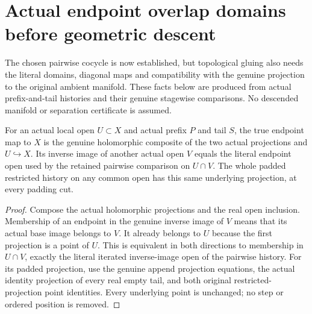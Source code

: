 \section{Actual endpoint overlap domains before geometric descent}

The chosen pairwise cocycle is now established, but topological gluing also
needs the literal domains, diagonal maps and compatibility with the genuine
projection to the original ambient manifold. These facts below are produced
from actual prefix-and-tail histories and their genuine stagewise comparisons.
No descended manifold or separation certificate is assumed.

\begin{lemma}
\label{hir:sharp-actual-endpoint-projection-overlap}
\leanok
{}
For an actual local open $U\subset X$ and actual prefix $P$ and tail $S$,
the true endpoint map to $X$ is the genuine holomorphic composite of the two
actual projections and $U\hookrightarrow X$. Its inverse image of another
actual open $V$ equals the literal endpoint open used by the retained pairwise
comparison on $U\cap V$. The whole padded restricted history on any common
open has this same underlying projection, at every padding cut.
\end{lemma}
\begin{proof}
Compose the actual holomorphic projections and the real open inclusion.
Membership of an endpoint in the genuine inverse image of $V$ means that
its actual base image belongs to $V$. It already belongs to $U$ because the
first projection is a point of $U$. This is equivalent in both directions
to membership in $U\cap V$, exactly the literal iterated inverse-image open
of the pairwise history. For its padded projection, use the genuine append
projection equations, the actual identity projection of every real empty
tail, and both original restricted-projection point identities. Every
underlying point is unchanged; no step or ordered position is removed.
\end{proof}

